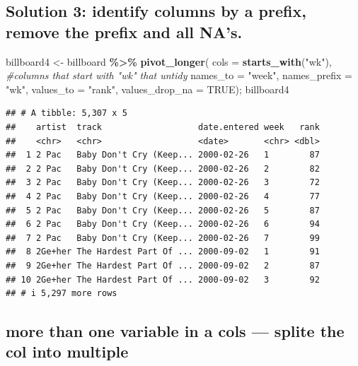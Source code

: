 \documentclass[
]{article}
\newenvironment{Shaded}{\begin{snugshade}}{\end{snugshade}}
\newcommand{\AttributeTok}[1]{\textcolor[rgb]{0.13,0.29,0.53}{#1}}
\newcommand{\CommentTok}[1]{\textcolor[rgb]{0.56,0.35,0.01}{\textit{#1}}}
\newcommand{\ConstantTok}[1]{\textcolor[rgb]{0.56,0.35,0.01}{#1}}
\newcommand{\FunctionTok}[1]{\textcolor[rgb]{0.13,0.29,0.53}{\textbf{#1}}}
\newcommand{\NormalTok}[1]{#1}
\newcommand{\OtherTok}[1]{\textcolor[rgb]{0.56,0.35,0.01}{#1}}
\newcommand{\SpecialCharTok}[1]{\textcolor[rgb]{0.81,0.36,0.00}{\textbf{#1}}}
\newcommand{\StringTok}[1]{\textcolor[rgb]{0.31,0.60,0.02}{#1}}
\begin{document}
\hypertarget{solution-3-identify-columns-by-a-prefix-remove-the-prefix-and-all-nas.}{%
\subsection{Solution 3: identify columns by a prefix, remove the prefix
and all
NA's.}\label{solution-3-identify-columns-by-a-prefix-remove-the-prefix-and-all-nas.}}

\begin{Shaded}
\begin{Highlighting}[]
\NormalTok{billboard4 }\OtherTok{\textless{}{-}}\NormalTok{ billboard }\SpecialCharTok{\%\textgreater{}\%} 
   \FunctionTok{pivot\_longer}\NormalTok{(}
   \AttributeTok{cols =} \FunctionTok{starts\_with}\NormalTok{(}\StringTok{"wk"}\NormalTok{), }\CommentTok{\#columns that start with "wk" that untidy}
   \AttributeTok{names\_to =} \StringTok{"week"}\NormalTok{,}
   \AttributeTok{names\_prefix =} \StringTok{"wk"}\NormalTok{,}
   \AttributeTok{values\_to =} \StringTok{"rank"}\NormalTok{,}
   \AttributeTok{values\_drop\_na =} \ConstantTok{TRUE}\NormalTok{); billboard4}
\end{Highlighting}
\end{Shaded}

\begin{verbatim}
## # A tibble: 5,307 x 5
##    artist  track                   date.entered week   rank
##    <chr>   <chr>                   <date>       <chr> <dbl>
##  1 2 Pac   Baby Don't Cry (Keep... 2000-02-26   1        87
##  2 2 Pac   Baby Don't Cry (Keep... 2000-02-26   2        82
##  3 2 Pac   Baby Don't Cry (Keep... 2000-02-26   3        72
##  4 2 Pac   Baby Don't Cry (Keep... 2000-02-26   4        77
##  5 2 Pac   Baby Don't Cry (Keep... 2000-02-26   5        87
##  6 2 Pac   Baby Don't Cry (Keep... 2000-02-26   6        94
##  7 2 Pac   Baby Don't Cry (Keep... 2000-02-26   7        99
##  8 2Ge+her The Hardest Part Of ... 2000-09-02   1        91
##  9 2Ge+her The Hardest Part Of ... 2000-09-02   2        87
## 10 2Ge+her The Hardest Part Of ... 2000-09-02   3        92
## # i 5,297 more rows
\end{verbatim}

\hypertarget{more-than-one-variable-in-a-cols-splite-the-col-into-multiple}{%
\subsection{more than one variable in a cols --- splite the col into
multiple}\label{more-than-one-variable-in-a-cols-splite-the-col-into-multiple}}
\end{document}
